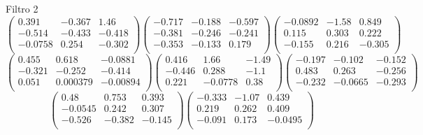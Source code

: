 Filtro 2
{ \small
\[
\begin{pmatrix}
  0.391 & -0.367 & 1.46 \\
  -0.514 & -0.433 & -0.418 \\
  -0.0758 & 0.254 & -0.302 \\
\end{pmatrix}
\begin{pmatrix}
  -0.717 & -0.188 & -0.597 \\
  -0.381 & -0.246 & -0.241 \\
  -0.353 & -0.133 & 0.179 \\
\end{pmatrix}
\begin{pmatrix}
  -0.0892 & -1.58 & 0.849 \\
  0.115 & 0.303 & 0.222 \\
  -0.155 & 0.216 & -0.305 \\
\end{pmatrix}
\]
\[
\begin{pmatrix}
  0.455 & 0.618 & -0.0881 \\
  -0.321 & -0.252 & -0.414 \\
  0.051 & 0.000379 & -0.00894 \\
\end{pmatrix}
\begin{pmatrix}
  0.416 & 1.66 & -1.49 \\
  -0.446 & 0.288 & -1.1 \\
  0.221 & -0.0778 & 0.38 \\
\end{pmatrix}
\begin{pmatrix}
  -0.197 & -0.102 & -0.152 \\
  0.483 & 0.263 & -0.256 \\
  -0.232 & -0.0665 & -0.293 \\
\end{pmatrix}
\]
\[
\begin{pmatrix}
  0.48 & 0.753 & 0.393 \\
  -0.0545 & 0.242 & 0.307 \\
  -0.526 & -0.382 & -0.145 \\
\end{pmatrix}
\begin{pmatrix}
  -0.333 & -1.07 & 0.439 \\
  0.219 & 0.262 & 0.409 \\
  -0.091 & 0.173 & -0.0495 \\
\end{pmatrix}
\]
}

